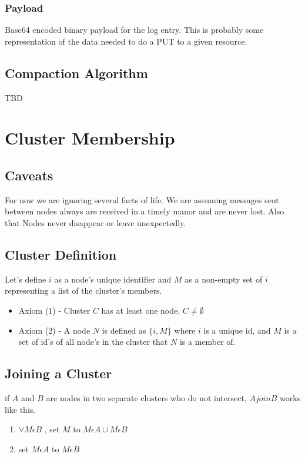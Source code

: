 \subsubsection{Payload}
Base64 encoded binary payload for the log entry.  This is probably some representation of the data needed to do a PUT to a given resource.


\subsection{Compaction Algorithm}
TBD


\section{Cluster Membership}
\subsection{Caveats}
For now we are ignoring several facts of life.  We are assuming messages sent between nodes always are received in a timely manor and are never lost.  Also that Nodes never disappear or leave unexpectedly.
\subsection{Cluster Definition}
Let's define $i$ as a node's unique identifier and $M$ as a non-empty set of $i$ representing a list of the cluster's members.

\begin{itemize}
\item Axiom (1) - Cluster $C$ has at least one node.  $C \not= \emptyset$
\item Axiom (2) - A node $N$ is defined as $\{i,M\}$ where $i$ is a unique id, and $M$ is a set of id's of all  node's in the cluster that $N$ is a member of. 
\end{itemize}

\subsection{Joining a Cluster}
if $A$ and $B$ are nodes in two separate clusters who do not intersect, $A join B$ works like this.


\begin{enumerate}
\item $\forall M \epsilon B$ , set $M$  to $M\epsilon A \cup M\epsilon B$
\item set $M \epsilon A$ to $M\epsilon B$

\end{enumerate}




